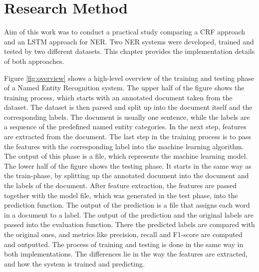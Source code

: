 \documentclass[12pt]{book}
\begin{document}
	\chapter{Research Method}
	\label{chap:method}
	
	Aim of this work was to conduct a practical study comparing a CRF approach and an LSTM approach for NER. Two NER systems were developed, trained and tested by two different datasets. This chapter provides the implementation details of both approaches.
	
	Figure \ref{fig:overview} shows a high-level overview of the training and testing phase of a Named Entity Recognition system. The upper half of the figure shows the training process, which starts with an annotated document taken from the dataset. The dataset is then parsed and split up into the document itself and the corresponding labels. The document is usually one sentence, while the labels are a sequence of the predefined named entity categories. In the next step, features are extracted from the document. The last step in the training process is to pass the features with the corresponding label into the machine learning algorithm. The output of this phase is a file, which represents the machine learning model. 
	The lower half of the figure shows the testing phase. It starts in the same way as the train-phase, by splitting up the annotated document into the document and the labels of the document. After feature extraction, the features are passed together with the model file, which was generated in the test phase, into the prediction function. The output of the prediction is a file that assigns each word in a document to a label. 
	The output of the prediction and the original labels are passed into the evaluation function. There the predicted labels are compared with the original ones, and metrics like precision, recall and F1-score are computed and outputted.
	The process of training and testing is done in the same way in both implementations. The differences lie in the way the features are extracted, and how the system is trained and predicting.
	
\end{document}
